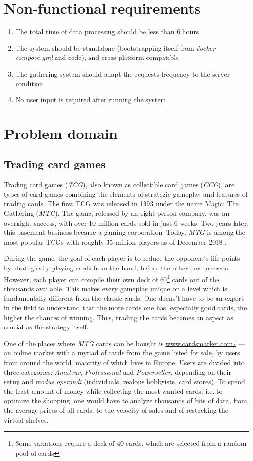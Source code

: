 \section{Non-functional requirements}
\begin{enumerate}
\item The total time of data processing should be less than 6 hours
\item The system should be standalone (bootstrapping itself from \textit{docker-compose.yml} and code), and cross-platform compatible
\item The gathering system should adapt the requests frequency to the server condition
\item No user input is required after running the system
\end{enumerate}


\section{Problem domain}

\subsection{Trading card games}
Trading card games (\textit{TCG}), also known as collectible card games (\textit{CCG}), are types of card games combining the elements of strategic gameplay and features of trading cards.
The first TCG was released in 1993 under the name Magic: The Gathering (\textit{MTG}). The game, released by an eight-person company, was an overnight success, with over 10 million cards sold in just 6 weeks.
Two years later, this basement business became a gaming corporation. Today, \textit{MTG} is among the most popular TCGs with roughly 35 million players as of December 2018 \cite{magicTheGathering}. \par
During the game, the goal of each player is to reduce the opponent's life points by strategically playing cards from the hand, before the other one succeeds. However, each player can compile their own deck of 60\footnote{Some variations require a deck of 40 cards, which are selected from a random pool of cards} cards out of the thousands available. This makes every gameplay unique on a level which is fundamentally different from the classic cards. One doens't have to be an expert in the field to understand that the more cards one has, especially good cards, the higher the chances of winning. Thus, trading the cards becomes an aspect as crucial as the strategy itself. \par
One of the places where \textit{MTG} cards can be bought is \url{www.cardsmarket.com/} --- an online market with a myriad of cards from the game listed for sale, by users from around the world, majority of which lives in Europe. Users are divided into three categories: \textit{Amateur}, \textit{Professional} and \textit{Powerseller}, depending on their setup and \textit{modus operandi} (individuals, zealous hobbyists, card stores). To spend the least amount of money while collecting the most wanted cards, i.e. to optimize the shopping, one would have to analyze thousands of bits of data, from the average prices of all cards, to the velocity of sales and of restocking the virtual shelves.

